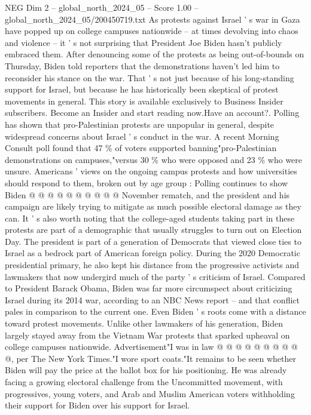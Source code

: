 \begin{textsample}{NEG Dim 2 – global\_north\_2024\_05 – Score 1.00 – global\_north\_2024\_05/200450719.txt}  \label{ex:f2_neg_155}
As protests against Israel ' s war in Gaza have popped up on college campuses nationwide -- at times devolving into chaos and violence -- it ' s not surprising that President Joe Biden hasn't publicly embraced them.
After denouncing some of the protests as being out-of-bounds on Thursday, Biden told reporters that the demonstrations haven't led him to reconsider his stance on the war.
That ' s not just because of his long-standing support for Israel, but because he has historically been skeptical of protest movements in general.
This story is available exclusively to Business Insider subscribers.
Become an Insider and start reading now.Have an account?.
Polling has shown that pro-Palestinian protests are unpopular in general, despite widespread concerns about Israel ' s conduct in the war.
A recent Morning Consult poll found that 47 \% of voters supported banning"pro-Palestinian demonstrations on campuses,"versus 30 \% who were opposed and 23 \% who were unsure.
Americans ' views on the ongoing campus protests and how universities should respond to them, broken out by age group : Polling continues to show Biden @ @ @ @ @ @ @ @ @ @ November rematch, and the president and his campaign are likely trying to mitigate as much possible electoral damage as they can.
It ' s also worth noting that the college-aged students taking part in these protests are part of a demographic that usually struggles to turn out on Election Day.
The president is part of a generation of Democrats that viewed close ties to Israel as a bedrock part of American foreign policy.
During the 2020 Democratic presidential primary, he also kept his distance from the progressive activists and lawmakers that now undergird much of the party ' s criticism of Israel.
Compared to President Barack Obama, Biden was far more circumspect about criticizing Israel during its 2014 war, according to an NBC News report -- and that conflict pales in comparison to the current one.
Even Biden ' s roots come with a distance toward protest movements.
Unlike other lawmakers of his generation, Biden largely stayed away from the Vietnam War protests that sparked upheaval on college campuses nationwide.
Advertisement"I was in law @ @ @ @ @ @ @ @ @ @, per The New York Times."I wore sport coats."It remains to be seen whether Biden will pay the price at the ballot box for his positioning.
He was already facing a growing electoral challenge from the Uncommitted movement, with progressives, young voters, and Arab and Muslim American voters withholding their support for Biden over his support for Israel.

\end{textsample}
